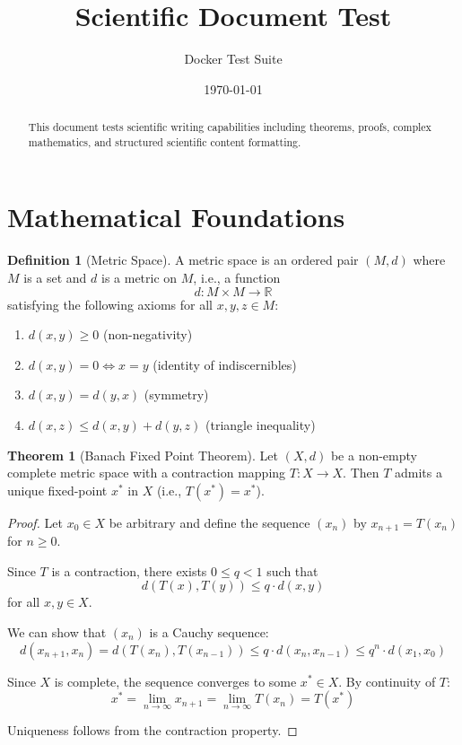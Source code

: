 \documentclass{article}
\title{Scientific Document Test}
\author{Docker Test Suite}
\date{\today}
\theoremstyle{definition}
\newtheorem{definition}{Definition}[section]
\newtheorem{theorem}{Theorem}[section]
\theoremstyle{remark}
\begin{document}
\maketitle

\begin{abstract}
This document tests scientific writing capabilities including theorems, proofs, complex mathematics, and structured scientific content formatting.
\end{abstract}

\section{Mathematical Foundations}

\begin{definition}[Metric Space]
A metric space is an ordered pair $(M, d)$ where $M$ is a set and $d$ is a metric on $M$, i.e., a function
\[
d: M \times M \to \mathbb{R}
\]
satisfying the following axioms for all $x, y, z \in M$:
\begin{enumerate}
    \item $d(x, y) \geq 0$ (non-negativity)
    \item $d(x, y) = 0 \iff x = y$ (identity of indiscernibles)
    \item $d(x, y) = d(y, x)$ (symmetry)
    \item $d(x, z) \leq d(x, y) + d(y, z)$ (triangle inequality)
\end{enumerate}
\end{definition}

\begin{theorem}[Banach Fixed Point Theorem]
\label{thm:banach}
Let $(X, d)$ be a non-empty complete metric space with a contraction mapping $T: X \to X$. Then $T$ admits a unique fixed-point $x^*$ in $X$ (i.e., $T(x^*) = x^*$).
\end{theorem}

\begin{proof}
Let $x_0 \in X$ be arbitrary and define the sequence $(x_n)$ by $x_{n+1} = T(x_n)$ for $n \geq 0$.

Since $T$ is a contraction, there exists $0 \leq q < 1$ such that
\[
d(T(x), T(y)) \leq q \cdot d(x, y)
\]
for all $x, y \in X$.

We can show that $(x_n)$ is a Cauchy sequence:
\[
d(x_{n+1}, x_n) = d(T(x_n), T(x_{n-1})) \leq q \cdot d(x_n, x_{n-1}) \leq q^n \cdot d(x_1, x_0)
\]

Since $X$ is complete, the sequence converges to some $x^* \in X$. By continuity of $T$:
\[
x^* = \lim_{n \to \infty} x_{n+1} = \lim_{n \to \infty} T(x_n) = T(x^*)
\]

Uniqueness follows from the contraction property.
\end{proof}
\end{document}
